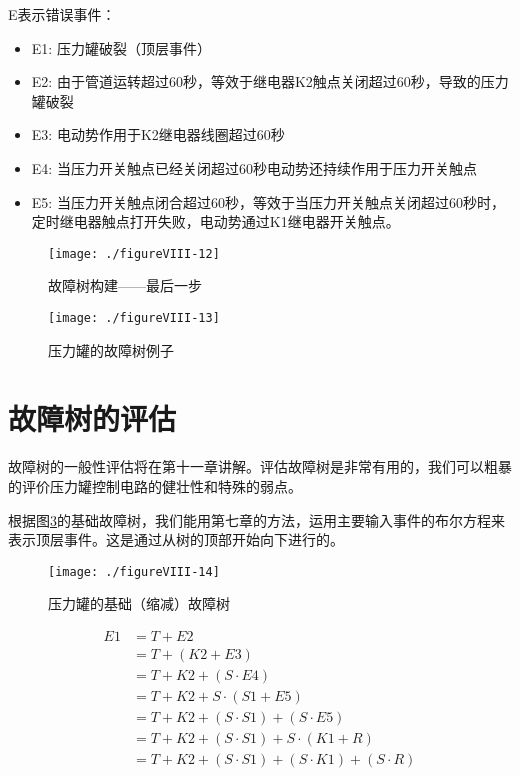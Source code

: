 \documentclass[cn,11pt,chinese]{elegantbook}
\begin{document}
{E表示错误事件：
\begin{itemize}
	\item E1: 压力罐破裂（顶层事件）
\item E2: 由于管道运转超过60秒，等效于继电器K2触点关闭超过60秒，导致的压力罐破裂
\item E3: 电动势作用于K2继电器线圈超过60秒
\item E4: 当压力开关触点已经关闭超过60秒电动势还持续作用于压力开关触点
\item E5: 当压力开关触点闭合超过60秒，等效于当压力开关触点关闭超过60秒时，定时继电器触点打开失败，电动势通过K1继电器开关触点。
\end{itemize}

\begin{figure}[H]
	\centering
	\texttt{[image: ./figureVIII-12]}
	\caption{故障树构建——最后一步}
	\label{fig8-12}
\end{figure}

\begin{figure}[H]
	\centering
	\texttt{[image: ./figureVIII-13]}
	\caption{压力罐的故障树例子}
	\label{fig8-13}
\end{figure}

\section{故障树的评估}

故障树的一般性评估将在第十一章讲解。评估故障树是非常有用的，我们可以粗暴的评价压力罐控制电路的健壮性和特殊的弱点。

根据图\ref{fig8-14}的基础故障树，我们能用第七章的方法，运用主要输入事件的布尔方程来表示顶层事件。这是通过从树的顶部开始向下进行的。

\begin{figure}[H]
	\centering
	\texttt{[image: ./figureVIII-14]}
	\caption{压力罐的基础（缩减）故障树}
	\label{fig8-14}
\end{figure}

\begin{align*}
E1  &= T+E2 \\
&=T+(K2+E3) \\
&=T+K2+(S\cdot E4)  \\
&=T+K2+S\cdot (S1+E5)   \\
&=T+K2+(S\cdot S1)+(S\cdot E5)  \\
&=T+K2+(S\cdot S1)+S\cdot(K1+R) \\
&=T+K2+(S\cdot S1)+(S\cdot K1)+(S\cdot R)
\end{align*}

}
\end{document}
